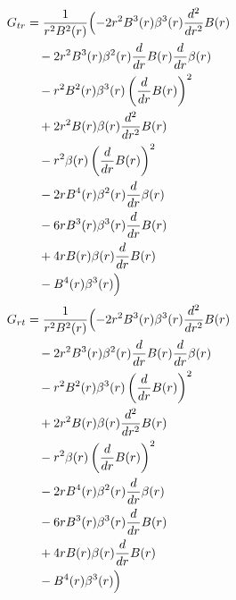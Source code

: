 \documentclass[11pt,a4paper]{article}
\begin{document}
\begin{align*}
  G_{tr} &= \frac{1}{r^{2} B^{2}{\left(r \right)}}\Bigl(- 2 r^{2} B^{3}{\left(r \right)} \beta^{3}{\left(r \right)} \frac{d^{2}}{d r^{2}} B{\left(r \right)} \\
  &\quad - 2 r^{2} B^{3}{\left(r \right)} \beta^{2}{\left(r \right)} \frac{d}{d r} B{\left(r \right)} \frac{d}{d r} \beta{\left(r \right)} \\
  &\quad - r^{2} B^{2}{\left(r \right)} \beta^{3}{\left(r \right)} \left(\frac{d}{d r} B{\left(r \right)}\right)^{2} \\
  &\quad + 2 r^{2} B{\left(r \right)} \beta{\left(r \right)} \frac{d^{2}}{d r^{2}} B{\left(r \right)} \\
  &\quad - r^{2} \beta{\left(r \right)} \left(\frac{d}{d r} B{\left(r \right)}\right)^{2} \\
  &\quad - 2 r B^{4}{\left(r \right)} \beta^{2}{\left(r \right)} \frac{d}{d r} \beta{\left(r \right)} \\
  &\quad - 6 r B^{3}{\left(r \right)} \beta^{3}{\left(r \right)} \frac{d}{d r} B{\left(r \right)} \\
  &\quad + 4 r B{\left(r \right)} \beta{\left(r \right)} \frac{d}{d r} B{\left(r \right)} \\
  &\quad - B^{4}{\left(r \right)} \beta^{3}{\left(r \right)}\Bigr)
\end{align*}
\begin{align*}
  G_{rt} &= \frac{1}{r^{2} B^{2}{\left(r \right)}}\Bigl(- 2 r^{2} B^{3}{\left(r \right)} \beta^{3}{\left(r \right)} \frac{d^{2}}{d r^{2}} B{\left(r \right)} \\
  &\quad - 2 r^{2} B^{3}{\left(r \right)} \beta^{2}{\left(r \right)} \frac{d}{d r} B{\left(r \right)} \frac{d}{d r} \beta{\left(r \right)} \\
  &\quad - r^{2} B^{2}{\left(r \right)} \beta^{3}{\left(r \right)} \left(\frac{d}{d r} B{\left(r \right)}\right)^{2} \\
  &\quad + 2 r^{2} B{\left(r \right)} \beta{\left(r \right)} \frac{d^{2}}{d r^{2}} B{\left(r \right)} \\
  &\quad - r^{2} \beta{\left(r \right)} \left(\frac{d}{d r} B{\left(r \right)}\right)^{2} \\
  &\quad - 2 r B^{4}{\left(r \right)} \beta^{2}{\left(r \right)} \frac{d}{d r} \beta{\left(r \right)} \\
  &\quad - 6 r B^{3}{\left(r \right)} \beta^{3}{\left(r \right)} \frac{d}{d r} B{\left(r \right)} \\
  &\quad + 4 r B{\left(r \right)} \beta{\left(r \right)} \frac{d}{d r} B{\left(r \right)} \\
  &\quad - B^{4}{\left(r \right)} \beta^{3}{\left(r \right)}\Bigr)
\end{align*}
\end{document}
